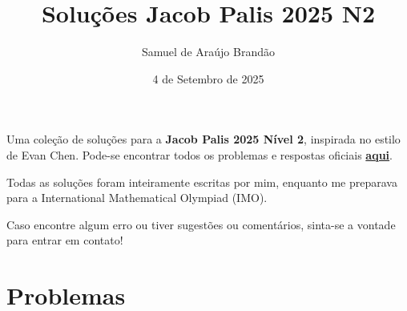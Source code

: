 \documentclass[12pt]{article}
\title{\sffamily\bfseries{Soluções Jacob Palis 2025 N2}}
\author{Samuel de Araújo Brandão}
\date{4 de Setembro de 2025}
\begin{document}
  \maketitle
  Uma coleção de soluções para a \textbf{Jacob Palis 2025 Nível 2}, inspirada no estilo de Evan Chen.
  Pode-se encontrar todos os problemas e respostas oficiais 
  \textbf{\href{https://www.obm.org.br/content/uploads/2025/06/provas_jacob_palis_2025.pdf}{aqui}}.

  Todas as soluções foram inteiramente escritas por mim, enquanto me preparava para a
  International Mathematical Olympiad (IMO).

  Caso encontre algum erro ou tiver sugestões ou comentários, sinta-se a vontade 
  para entrar em contato!

  \tableofcontents

  \clearpage

  \section{\textsf{Problemas}}
\end{document}
